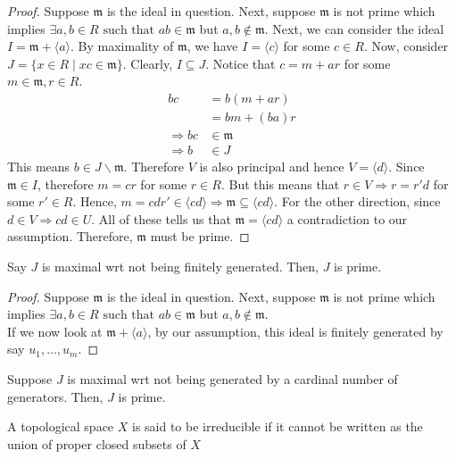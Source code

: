 \documentclass[oneside, 12pt]{scrbook}
\newcommand{\m}{\mathfrak{m}}
\theoremstyle{theorem}
\begin{document}
\begin{proof}
Suppose $\m$ is the ideal in question. Next, suppose $\m$ is not prime which implies  $\exists a,b \in R \text{ such that } ab \in \m$ but $a,b \not \in \m$. Next, we can consider the ideal $I = \m + \langle a \rangle$. By maximality of $\m$, we have $I = \langle c \rangle$ for some $c\in R$. Now, consider $J = \{x \in R \mid xc \in \m\}$. Clearly, $I \subseteq J$. Notice that $c = m + ar$ for some $m \in \m , r \in R$. 
\begin{align*}
bc &= b(m+ar) \\
&= bm + (ba)r \\
\Rightarrow bc &\in \m \\
\Rightarrow b &\in J 
\end{align*} 
This means $b \in J \backslash \m$. Therefore $V$ is also principal and hence $V = \langle d \rangle$. Since $\m \in I$, therefore $m = cr$ for some $r\in R$. But this means that $r\in V \Rightarrow r = r'd$ for some $r' \in R$. Hence, $m = cd r' \in \langle cd \rangle \Rightarrow \m \subseteq \langle cd \rangle$. For the other direction, since $d\in V \Rightarrow cd \in U$. All of these tells us that $\m = \langle cd \rangle$ a contradiction to our assumption. Therefore, $\m$ must be prime. 
\end{proof}


\begin{proposition}
Say $J$ is maximal wrt not being finitely generated. Then, $J$ is prime.
\end{proposition}

\begin{proof}
Suppose $\m$ is the ideal in question. Next, suppose $\m$ is not prime which implies  $\exists a,b \in R \text{ such that } ab \in \m$ but $a,b \not \in \m$. \\

If we now look at $\m + \langle a \rangle$, by our assumption, this ideal is finitely generated by say $u_{1}, \hdots , u_{m}$. 
\end{proof}

\begin{exercise}
Suppose $J$ is maximal wrt not being generated by a cardinal number of generators. Then, $J$ is prime.
\end{exercise}

\begin{definition}
A topological space $X$ is said to be irreducible if it cannot be written as the union of proper closed subsets of $X$
\end{definition}
\end{document}
